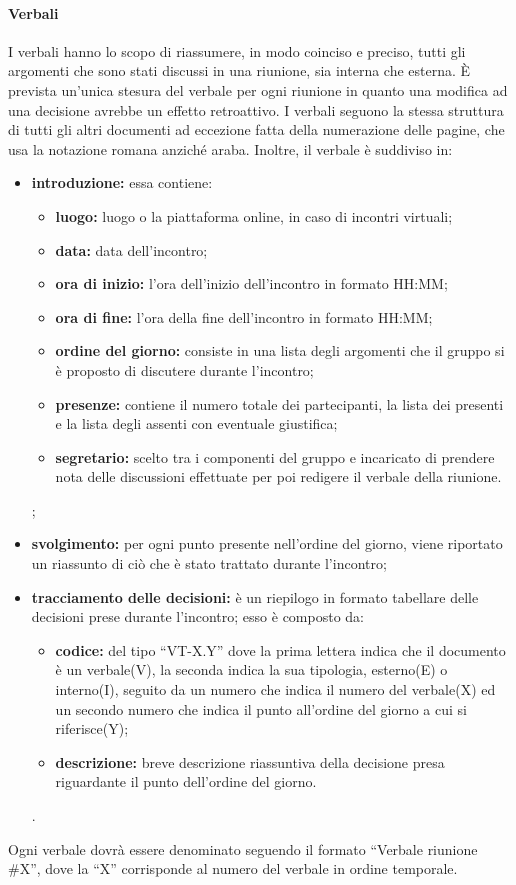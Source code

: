 			\paragraph{Verbali}
				I verbali hanno lo scopo di riassumere, in modo coinciso e preciso, tutti gli argomenti che sono stati discussi in una riunione, sia interna che esterna. È prevista un'unica stesura del verbale per ogni riunione in quanto una modifica ad una decisione avrebbe un effetto retroattivo. I verbali seguono la stessa struttura di tutti gli altri documenti ad eccezione fatta della numerazione delle pagine, che usa la notazione romana anziché araba. Inoltre, il verbale è suddiviso in:
				\begin{itemize}
					\item \textbf{introduzione:} essa contiene:
						\begin{itemize}
							\item \textbf{luogo:} luogo o la piattaforma online, in caso di incontri virtuali;
							\item \textbf{data:} data dell'incontro;
							\item \textbf{ora di inizio:} l'ora dell'inizio dell'incontro in formato HH:MM;
							\item \textbf{ora di fine:} l'ora della fine dell'incontro in formato HH:MM;
							\item \textbf{ordine del giorno:} consiste in una lista degli argomenti che il gruppo si è proposto di discutere durante l'incontro;
							\item \textbf{presenze:} contiene il numero totale dei partecipanti, la lista dei presenti e la lista degli assenti con eventuale giustifica;
							\item \textbf{segretario: } scelto tra i componenti del gruppo e incaricato di prendere nota delle discussioni effettuate per poi redigere il verbale della riunione.
						\end{itemize};
					\item \textbf{svolgimento:} per ogni punto presente nell'ordine del giorno, viene riportato un riassunto di ciò che è stato trattato durante l'incontro;
					\item \textbf{tracciamento delle decisioni:} è un riepilogo in formato tabellare delle decisioni prese durante l'incontro; esso è composto da:
						\begin{itemize}
							\item \textbf{codice:} del tipo ``VT-X.Y'' dove la prima lettera indica che il documento è un verbale(V), la seconda indica la sua tipologia, esterno(E) o interno(I), seguito da un numero che indica il numero del verbale(X) ed un secondo numero che indica il punto all'ordine del giorno a cui si riferisce(Y);
							\item \textbf{descrizione:} breve descrizione riassuntiva della decisione presa riguardante il punto dell'ordine del giorno.
					\end{itemize}.
				\end{itemize}
				Ogni verbale dovrà essere denominato seguendo il formato ``Verbale riunione \#X'', dove la ``X'' corrisponde al numero del verbale in ordine temporale.
